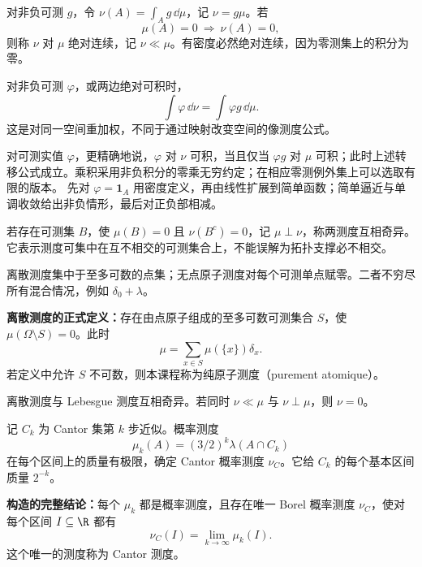 对非负可测 $g$，令 $\nu(A)=\int_Ag\,\dd\mu$，记 $\nu=g\mu$。若
\[
\mu(A)=0\ \Longrightarrow\ \nu(A)=0,
\]
则称 $\nu$ 对 $\mu$ 绝对连续，记 $\nu\ll\mu$。有密度必然绝对连续，因为零测集上的积分为零。

对非负可测 $\varphi$，或两边绝对可积时，
\[
\int\varphi\,\dd\nu=\int\varphi g\,\dd\mu.
\]
这是对同一空间重加权，不同于通过映射改变空间的像测度公式。

对可测实值 $\varphi$，更精确地说，$\varphi$ 对 $\nu$ 可积，当且仅当 $\varphi g$ 对 $\mu$ 可积；此时上述转移公式成立。乘积采用非负积分的零乘无穷约定；在相应零测例外集上可以选取有限的版本。
先对 $\varphi=\mathbf1_A$ 用密度定义，再由线性扩展到简单函数；简单逼近与单调收敛给出非负情形，最后对正负部相减。

若存在可测集 $B$，使 $\mu(B)=0$ 且 $\nu(B^c)=0$，记 $\mu\perp\nu$，称两测度互相奇异。它表示测度可集中在互不相交的可测集合上，不能误解为拓扑支撑必不相交。

离散测度集中于至多可数的点集；无点原子测度对每个可测单点赋零。二者不穷尽所有混合情况，例如 $\delta_0+\lambda$。

\textbf{离散测度的正式定义：}存在由点原子组成的至多可数可测集合 $S$，使 $\mu(\Omega\setminus S)=0$。此时
\[
\mu=\sum_{x\in S}\mu(\{x\})\delta_x.
\]
若定义中允许 $S$ 不可数，则本课程称为纯原子测度（purement atomique）。

离散测度与 Lebesgue 测度互相奇异。若同时 $\nu\ll\mu$ 与 $\nu\perp\mu$，则 $\nu=0$。

记 $C_k$ 为 Cantor 集第 $k$ 步近似。概率测度
\[
\mu_k(A)=(3/2)^k\lambda(A\cap C_k)
\]
在每个区间上的质量有极限，确定 Cantor 概率测度 $\nu_C$。它给 $C_k$ 的每个基本区间质量 $2^{-k}$。

\textbf{构造的完整结论：}每个 $\mu_k$ 都是概率测度，且存在唯一 Borel 概率测度 $\nu_C$，使对每个区间 $I\subseteq\R$ 都有
\[
\nu_C(I)=\lim_{k\to\infty}\mu_k(I).
\]
这个唯一的测度称为 Cantor 测度。

